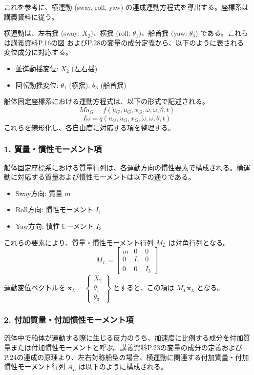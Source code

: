 \documentclass{article}
\begin{document}
これを参考に、横運動 (sway, roll, yaw) の連成運動方程式を導出する。座標系は講義資料に従う。

横運動は、左右揺 (sway: $X_2$)、横揺 (roll: $\theta_1$)、船首揺 (yaw: $\theta_3$) である。これらは講義資料P.16の図 およびP.28の変量の成分定義から、以下のように表される変位成分に対応する。

\begin{itemize}
    \item 並進動揺変位: $X_2$ (左右揺)
    \item 回転動揺変位: $\theta_1$ (横揺), $\theta_3$ (船首揺)
\end{itemize}

船体固定座標系における運動方程式は、以下の形式で記述される。
$$M\dot{u}_{G}=f(\dot{u}_{G},u_{G},x_{G},\dot{\omega},\omega,\theta,t)$$
$$I\dot{\omega}=q(\dot{u}_{G},u_{G},x_{G},\dot{\omega},\omega,\theta,t)$$
これらを線形化し、各自由度に対応する項を整理する。

\subsubsection*{1. 質量・慣性モーメント項}
船体固定座標系における質量行列は、各運動方向の慣性要素で構成される。横運動に対応する質量および慣性モーメントは以下の通りである。
\begin{itemize}
    \item Sway方向: 質量 $m$
    \item Roll方向: 慣性モーメント $I_1$
    \item Yaw方向: 慣性モーメント $I_3$
\end{itemize}
これらの要素により、質量・慣性モーメント行列 $M_L$ は対角行列となる。
$$ M_L = \begin{bmatrix}
m & 0 & 0 \\
0 & I_1 & 0 \\
0 & 0 & I_3
\end{bmatrix} $$
運動変位ベクトルを $\mathbf{x}_L = \begin{Bmatrix} X_2 \\ \theta_1 \\ \theta_3 \end{Bmatrix}$ とすると、この項は $M_L \ddot{\mathbf{x}}_L$ となる。

\subsubsection*{2. 付加質量・付加慣性モーメント項}
流体中で船体が運動する際に生じる反力のうち、加速度に比例する成分を付加質量または付加慣性モーメントと呼ぶ。講義資料P.23の変量の成分の定義およびP.24の連成の原理より、左右対称船型の場合、横運動に関連する付加質量・付加慣性モーメント行列 $A_L$ は以下のように構成される。
\end{document}
